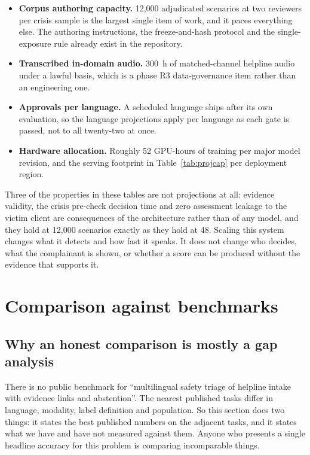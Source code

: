\documentclass[11pt,a4paper]{article}
\begin{document}
\begin{itemize}
  \item \textbf{Corpus authoring capacity.} 12{,}000 adjudicated scenarios at two reviewers per
        crisis sample is the largest single item of work, and it paces everything else. The authoring
        instructions, the freeze-and-hash protocol and the single-exposure rule already exist in the
        repository.
  \item \textbf{Transcribed in-domain audio.} 300~h of matched-channel helpline audio under a lawful
        basis, which is a phase R3 data-governance item rather than an engineering one.
  \item \textbf{Approvals per language.} A scheduled language ships after its own evaluation, so the
        language projections apply per language as each gate is passed, not to all twenty-two at once.
  \item \textbf{Hardware allocation.} Roughly 52 GPU-hours of training per major model revision, and
        the serving footprint in Table~\ref{tab:projcap} per deployment region.
\end{itemize}

\begin{keybox}[title={Where the architecture already makes the projection safe}]
\small
Three of the properties in these tables are not projections at all: evidence validity, the crisis
pre-check decision time and zero assessment leakage to the victim client are consequences of the
architecture rather than of any model, and they hold at 12{,}000 scenarios exactly as they hold at
48. Scaling this system changes what it detects and how fast it speaks. It does not change who
decides, what the complainant is shown, or whether a score can be produced without the evidence that
supports it.
\end{keybox}

\section{Comparison against benchmarks}
\label{sec:bench}

\subsection{Why an honest comparison is mostly a gap analysis}
There is no public benchmark for ``multilingual safety triage of helpline intake with evidence links
and abstention''. The nearest published tasks differ in language, modality, label definition and
population. So this section does two things: it states the best published numbers on the adjacent
tasks, and it states what we have and have not measured against them. Anyone who presents a single
headline accuracy for this problem is comparing incomparable things.
\end{document}
